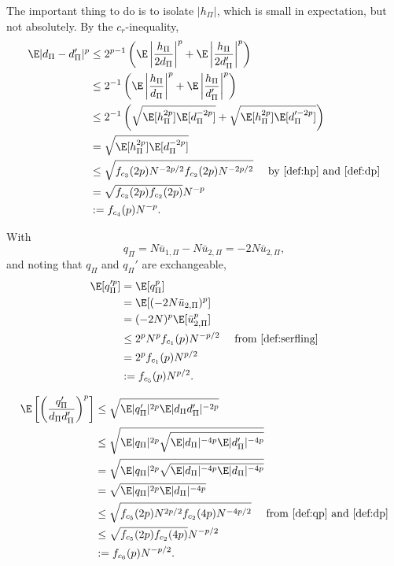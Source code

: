 The important thing to do is to isolate $|h_{\Pi}|$, which is small in
expectation, but not absolutely.  By the $c_r$-inequality,
\begin{align}
  \E |d_{\Pi}-d_{\Pi}'|^p 
  &\leq 2^{p-1} \left ( \E \left | \frac{h_{\Pi}}{2d_{\Pi}} \right |^p + \E \left |
      \frac{h_{\Pi}}{2d_{\Pi}'} \right |^p \right ) \nonumber \\
  &\leq 2^{-1} \left ( \E \left | \frac{h_{\Pi}}{d_{\Pi}} \right |^p + \E \left |
      \frac{h_{\Pi}}{d_{\Pi}'} \right |^p \right ) \nonumber \\
  &\leq 2^{-1} \left ( \sqrt{\E[h_{\Pi}^{2p}]\E[d_{\Pi}^{-2p}]} +
  \sqrt{\E[h_{\Pi}^{2p}]\E[d_{\Pi}'^{-2p}]} \right ) \nonumber \\
  &= \sqrt{\E[h_{\Pi}^{2p}]\E[d_{\Pi}^{-2p}]} \nonumber \\
  &\leq \sqrt{f_{c_3}(2p)N^{-2p/2} f_{c_2}(2p) N^{-2p/2}} \quad \text{ by } \eqref{def:hp}
  \text{ and } \eqref{def:dp} \nonumber \\
  &= \sqrt{f_{c_3}(2p) f_{c_2}(2p)} N^{-p} \nonumber \\
  &:= f_{c_4}(p) N^{-p} \label{def:ddiffp}.
\end{align}

With 
\begin{equation}
  \label{eq:qpi}
  q_{\Pi} = N\bar{u}_{1,\Pi} - N\bar{u}_{2,\Pi} = -2N\bar{u}_{2,\Pi},
\end{equation}
and noting that $q_{\Pi}$
and $q_{\Pi}'$ are exchangeable,
\begin{align}
  \E[q_{\Pi}'^p] 
  &= \E[q_{\Pi}^p] \nonumber \\
  &= \E[(-2N\bar{u}_{2,\Pi})^p] \nonumber \\
  &= (-2N)^p \E[\bar{u}_{2,\Pi}^p] \nonumber \\
  &\leq 2^pN^p f_{c_1}(p)N^{-p/2} \quad \text{ from } \eqref{def:serfling} \nonumber \\
  &= 2^p f_{c_1}(p)N^{p/2} \nonumber \\
  &:= f_{c_5}(p) N^{p/2} \label{def:qp}.
\end{align}

\begin{align}
  \E \left [ \left ( \frac{q_{\Pi}'}{d_{\Pi}d_{\Pi}'} \right )^p \right ]
  &\leq \sqrt{\E |q_{\Pi}'|^{2p} \E |d_{\Pi}d_{\Pi}'|^{-2p}} \nonumber \\
  &\leq \sqrt{\E |q_{\Pi}|^{2p} \sqrt{\E |d_{\Pi}|^{-4p} \E |d_{\Pi}'|^{-4p}}} \nonumber \\
  &= \sqrt{\E |q_{\Pi}|^{2p} \sqrt{\E |d_{\Pi}|^{-4p} \E |d_{\Pi}|^{-4p}}} \nonumber \\
  &= \sqrt{\E |q_{\Pi}|^{2p} \E |d_{\Pi}|^{-4p}} \nonumber \\ 
  &\leq \sqrt{f_{c_5}(2p) N^{2p/2} f_{c_2}(4p) N^{-4p/2}} \quad \text{ from
  } \eqref{def:qp} \text{ and } \eqref{def:dp} \nonumber \\
  &\leq \sqrt{f_{c_5}(2p) f_{c_2}(4p)} N^{-p/2} \nonumber \\
  &:= f_{c_6}(p) N^{-p/2} \label{def:qpddp}.
\end{align}

